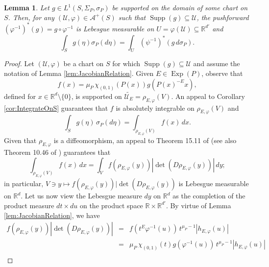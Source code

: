 \documentclass[11pt]{article}
\newtheorem{lemma}[theorem]{Lemma}
\newcommand\Exp{\operatorname{Exp}}
\newcommand\supp{\operatorname{Supp}}
\renewcommand\det{\operatorname{det}}
\begin{document}
\begin{lemma}\label{lem:LocalIntegralFormula}
Let $g\in L^1(S,\Sigma_P,\sigma_P)$ be supported on the domain of some chart on $S$. Then, for any $(\mathcal{U},\varphi)\in\mathcal{A}^+(S)$ such that $\supp(g)\subseteq\mathcal{U}$, the pushforward $(\varphi^{-1})^*(g)=g\circ\varphi^{-1}$ is Lebesgue measurable on $U=\varphi(\mathcal{U})\subseteq\mathbb{R}^{d'}$ and 
\begin{equation*}
\int_S g(\eta)\sigma_P(d\eta)=\int_{U}(\psi^{-1})^*(g\, d\sigma_P).
\end{equation*}
\end{lemma}
\begin{proof}
Let $(\mathcal{U},\varphi)$ be a chart on $S$ for which $\supp(g)\subseteq \mathcal{U}$ and assume the notation of Lemma \ref{lem:JacobianRelation}. Given $E\in\Exp(P)$, observe that
\begin{equation*}
    f(x)=\mu_P\, \chi_{(0,1)}(P(x))g(P(x)^{-E}x),
\end{equation*}
defined for $x\in\mathbb{R}^d\setminus\{0\}$, is supported on $\widetilde{\mathcal{U}_E}=\rho_{E,\varphi}(V)$. An appeal to Corollary \ref{cor:IntegrateOnS} guarantees that $f$ is absolutely integrable on $\rho_{E,\varphi}(V)$ and
\begin{equation}\label{eq:LocalIntegralFormula1}
\int_S g(\eta)\,\sigma_P(d\eta)=\int_{\rho_{E,\varphi}(V)}f(x)\,dx.
\end{equation}
Given that $\rho_{E,\varphi}$ is a diffeomorphism, an appeal to Theorem 15.11 of \cite{Apostol1974} (see also Theorem 10.46 of \cite{Browder1996}) guarantees that
\begin{equation}\label{eq:LocalIntegralFormula2}
\int_{\rho_{E,\varphi}(V)}f(x)\,dx=\int_V f(\rho_{E,\varphi}(y))|\det(D\rho_{E,\varphi}(y))|\,dy;
\end{equation}
in particular, $V\ni y\mapsto f(\rho_{E,\varphi}(y))|\det(D\rho_{E,\varphi}(y))$ is Lebesgue measurable on $\mathbb{R}^{d}$. Let us now view the Lebesgue measure $dy$ on $\mathbb{R}^d$ as the completion of the product measure $dt\times du$ on the product space $\mathbb{R}\times\mathbb{R}^{d'}$. By virtue of Lemma \ref{lem:JacobianRelation}, we have
\begin{eqnarray}\label{eq:LocalIntegralFormula3}\nonumber
    f(\rho_{E,\varphi}(y))|\det(D\rho_{E,\varphi}(y))|
    &=& f(t^E\varphi^{-1}(u))\,t^{\mu_{P}-1}|h_{E,\varphi}(u)|\\ \nonumber
    &=& \mu_P\,\chi_{(0,1)}(t)g(\varphi^{-1}(u))\, t^{\mu_P-1}|h_{E,\varphi}(u)|\\ 

\end{eqnarray}
\end{proof}
\end{document}
